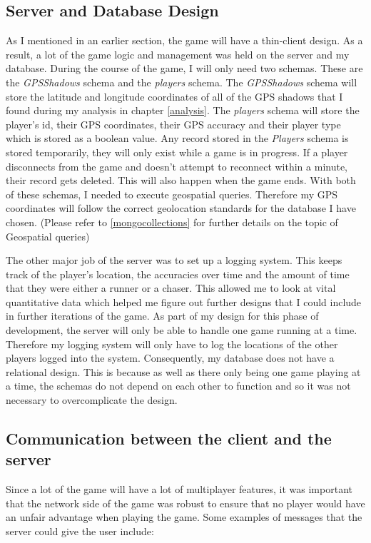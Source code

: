 \documentclass{l4proj}
\begin{document}
\subsection{Server and Database Design}
As I mentioned in an earlier section, the game will have a thin-client design. As a result, a lot of the game logic and
management was held on the server and my database. During the course of the game, I will only need two schemas. These
are the \textit{GPSShadows} schema and the \textit{players} schema. The \textit{GPSShadows} schema will store the latitude
and longitude coordinates of all of the GPS shadows that I found during my analysis in chapter \ref{analysis}. The 
\textit{players} schema will store the player's id, their GPS coordinates, their GPS accuracy and their player type which is
stored as a boolean value. Any record stored in the \textit{Players} schema is stored temporarily, they will only exist while
a game is in progress. If a player disconnects from the game and doesn't attempt to reconnect within a minute, their record gets
deleted. This will also happen when the game ends. With both of these schemas, I needed to execute
geospatial queries. Therefore my GPS coordinates will follow the correct geolocation standards for the database I have chosen.
(Please refer to \ref{mongocollections} for further details on the topic of Geospatial queries)

The other major job of the server was to set up a logging system. This keeps track of the player's location, the accuracies
over time and the amount of time that they were either a runner or a chaser. This allowed me to look at vital quantitative data
which helped me figure out further designs that I could include in further iterations of the game. As part of my design for this
phase of development, the server will only be able to handle one game running at a time. Therefore my logging system will only
have to log the locations of the other players logged into the system. Consequently, my database does not have a relational
design. This is because as well as there only being one game playing at a time, the schemas do not depend on each other to
function and so it was not necessary to overcomplicate the design. 

\subsection{Communication between the client and the server}
\label{communication}
Since a lot of the game will have a lot of multiplayer features, it was important that the network side of the game
was robust to ensure that no player would have an unfair advantage when playing the game. Some examples of messages that the server
could give the user include:
\end{document}
